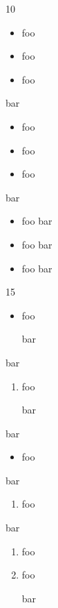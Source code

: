 10

\begin{itemize}
\item foo

\item foo

\item foo

\end{itemize}

bar

\begin{itemize}
\item foo

\item foo

\item foo

\end{itemize}

bar

\begin{itemize}
\item foo
bar

\item foo
bar

\item foo
bar

\end{itemize}

15

\begin{itemize}
\item foo

bar

\end{itemize}

bar

\begin{enumerate}
\item foo

bar

\end{enumerate}

bar

\begin{itemize}
\item foo

\end{itemize}

bar

\begin{enumerate}
\item foo

\end{enumerate}

bar

\begin{enumerate}
\item foo

\item foo

bar

\end{enumerate}



